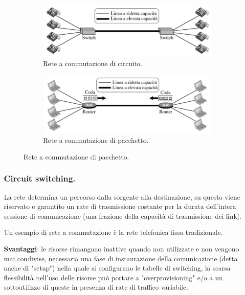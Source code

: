 \documentclass[11pt, italian, openany]{book}
\begin{document}
\begin{sloppypar}
\begin{figure}[h!]
	\begin{subfigure}{0.49 \linewidth} \centering
		\includegraphics[scale=0.25]{images/commutazione-circuito.png}
		\caption{Rete a commutazione di circuito.}
	\end{subfigure}
	\begin{subfigure}{0.49 \linewidth} \centering
		\includegraphics[scale=0.25]{images/commutazione-pacchetto.png}
		\caption{Rete a commutazione di pacchetto.}
	\end{subfigure}
\end{figure}

\subsubsection*{Circuit switching.}
La rete determina un percorso dalla sorgente alla destinazione, su questo viene riservato e garantito un rate di trasmissione costante per la
durata dell'intera sessione di comunicazione (una frazione della capacit\`a di trasmissione dei link).

Un esempio di rete a commutazione \`e la rete telefonica fissa tradizionale.

\textbf{Svantaggi}: le risorse rimangono inattive quando non utilizzate e non vengono mai condivise, necessaria una fase di instaurazione della
comunicazione (detta anche di "setup") nella quale si configurano le tabelle di switching, la scarsa flessibilit\`a nell'uso delle risorse pu\`o
portare a "overprovisioning" e/o a un sottoutilizzo di queste in presenza di rate di traffico variabile.


\end{sloppypar}
\end{document}
